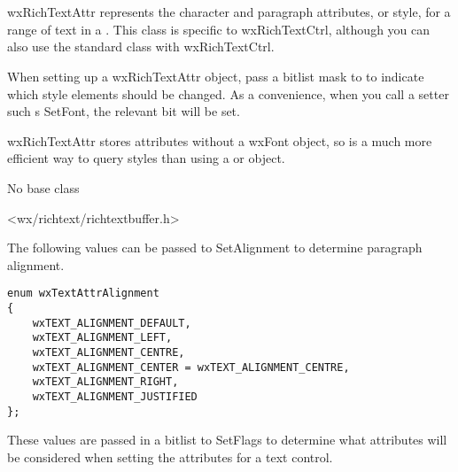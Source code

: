 \section{}\label{wxrichtextattr}

wxRichTextAttr represents the character and paragraph attributes, or style,
for a range of text in a . This class
is specific to wxRichTextCtrl, although you can also use the
standard  class with wxRichTextCtrl.

When setting up a wxRichTextAttr object, pass a bitlist mask to  to
indicate which style elements should be changed. As a convenience, when you call a setter such
s SetFont, the relevant bit will be set.

wxRichTextAttr stores attributes without a wxFont object, so is a much more
efficient way to query styles than using a  or  object.


No base class


<wx/richtext/richtextbuffer.h>


The following values can be passed to SetAlignment to determine
paragraph alignment.

{\small
\begin{verbatim}
enum wxTextAttrAlignment
{
    wxTEXT_ALIGNMENT_DEFAULT,
    wxTEXT_ALIGNMENT_LEFT,
    wxTEXT_ALIGNMENT_CENTRE,
    wxTEXT_ALIGNMENT_CENTER = wxTEXT_ALIGNMENT_CENTRE,
    wxTEXT_ALIGNMENT_RIGHT,
    wxTEXT_ALIGNMENT_JUSTIFIED
};
\end{verbatim}
}

These values are passed in a bitlist to SetFlags to determine
what attributes will be considered when setting the attributes
for a text control.

